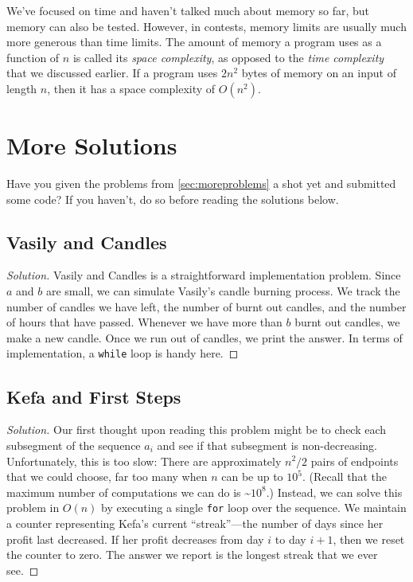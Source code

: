 We've focused on time and haven't talked much about memory so far, but memory can also be tested. However, in contests, memory limits are usually much more generous than time limits. The amount of memory a program uses as a function of $n$ is called its \emph{space complexity}, as opposed to the \emph{time complexity} that we discussed earlier. If a program uses $2n^2$ bytes of memory on an input of length $n$, then it has a space complexity of $O(n^2)$.

\section{More Solutions}


Have you given the problems from \ref{sec:moreproblems} a shot yet and submitted some code? If you haven't, do so before reading the solutions below.

\subsection{Vasily and Candles}

\begin{proof}[Solution]
  Vasily and Candles is a straightforward implementation problem. Since $a$ and $b$ are small, we can simulate Vasily's candle burning process. We track the number of candles we have left, the number of burnt out candles, and the number of hours that have passed. Whenever we have more than $b$ burnt out candles, we make a new candle. Once we run out of candles, we print the answer. In terms of implementation, a \texttt{while} loop is handy here.
\end{proof}

\subsection{Kefa and First Steps}

\begin{proof}[Solution]
Our first thought upon reading this problem might be to check each subsegment of the sequence $a_i$ and see if that subsegment is non-decreasing. Unfortunately, this is too slow: There are approximately $n^2/2$ pairs of endpoints that we could choose, far too many when $n$ can be up to $10^5$. (Recall that the maximum number of computations we can do is \textasciitilde$10^8$.) Instead, we can solve this problem in $O(n)$ by executing a single \texttt{for} loop over the sequence. We maintain a counter representing Kefa's current ``streak''---the number of days since her profit last decreased. If her profit decreases from day $i$ to day $i+1$, then we reset the counter to zero. The answer we report is the longest streak that we ever see.
\end{proof}

